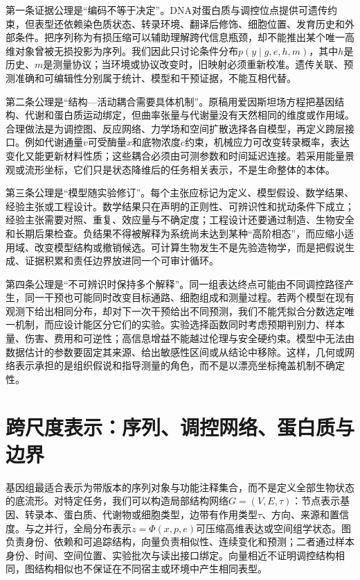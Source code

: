 第一条证据公理是“编码不等于决定”。DNA对蛋白质与调控位点提供可遗传约束，但表型还依赖染色质状态、转录环境、翻译后修饰、细胞位置、发育历史和外部条件。把序列称为有损压缩可以辅助理解跨代信息瓶颈，却不能推出某个唯一高维对象曾被无损投影为序列。我们因此只讨论条件分布$p(y\mid g,e,h,m)$，其中$h$是历史、$m$是测量协议；当环境或协议改变时，旧映射必须重新校准。遗传关联、预测准确和可编辑性分别属于统计、模型和干预证据，不能互相代替。

第二条公理是“结构—活动耦合需要具体机制”。原稿用爱因斯坦场方程把基因结构、代谢和蛋白质运动绑定，但曲率张量与代谢量没有天然相同的维度或作用域。合理做法是为调控图、反应网络、力学场和空间扩散选择各自模型，再定义跨层接口。例如代谢通量$v$可受酶量$x$和底物浓度$c$约束，机械应力可改变转录概率，表达变化又能更新材料性质；这些耦合必须由可测参数和时间延迟连接。若采用能量景观或流形坐标，它们只是状态降维后的任务相关表示，不是生命整体的本体。

第三条公理是“模型随实验修订”。每个主张应标记为定义、模型假设、数学结果、经验主张或工程设计。数学结果只在声明的正则性、可辨识性和扰动条件下成立；经验主张需要对照、重复、效应量与不确定度；工程设计还要通过制造、生物安全和长期后果检查。负结果不得被解释为系统尚未达到某种“高阶相态”，而应缩小适用域、改变模型结构或撤销候选。可计算生物发生不是先验造物学，而是把假说生成、证据积累和责任边界放进同一个可审计循环。

第四条公理是“不可辨识时保持多个解释”。同一组表达终点可能由不同调控路径产生，同一干预也可能同时改变目标通路、细胞组成和测量过程。若两个模型在现有观测下给出相同分布，却对下一次干预给出不同预测，我们不能凭拟合分数选定唯一机制，而应设计能区分它们的实验。实验选择函数同时考虑预期判别力、样本量、伤害、费用和可逆性；高信息增益不能越过伦理与安全硬约束。模型中无法由数据估计的参数要固定其来源、给出敏感性区间或从结论中移除。这样，几何或网络表示承担的是组织假说和指导测量的角色，而不是以漂亮坐标掩盖机制不确定性。

\section{跨尺度表示：序列、调控网络、蛋白质与边界}
\label{sec:tb_mapping}

基因组最适合表示为带版本的序列对象与功能注释集合，而不是定义全部生物状态的底流形。对特定任务，我们可以构造局部结构网络$G=(V,E,\tau)$：节点表示基因、转录本、蛋白质、代谢物或细胞类型，边带有作用类型$\tau$、方向、来源和置信度。与之并行，全局分布表示$z=\Phi(x,p,e)$可压缩高维表达或空间组学状态。图负责身份、依赖和可追踪结构，向量负责相似性、连续变化和预测；二者通过样本身份、时间、空间位置、实验批次与读出接口绑定。向量相近不证明调控结构相同，图结构相似也不保证在不同宿主或环境中产生相同表型。

